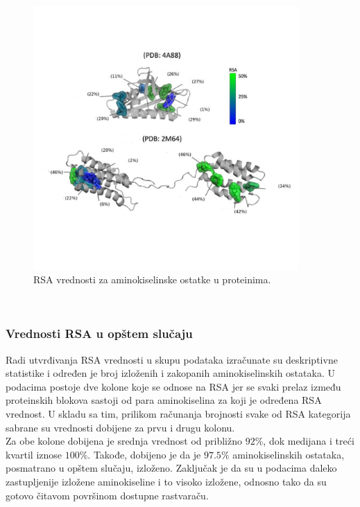 \documentclass[a4paper,12pt]{article}
\begin{document}
\begin{figure}[htbp]
    \centering
    \includegraphics[width=0.9\textwidth]{./images/rsa.png}
    \caption{RSA vrednosti za aminokiselinske ostatke u proteinima.}
    \label{Slika:rsa}
\end{figure}
\\
\subsubsection{Vrednosti RSA u opštem slučaju}
Radi utvrđivanja RSA vrednosti u skupu podataka izračunate su deskriptivne statistike i određen je broj izloženih i zakopanih aminokiselinskih ostataka. U podacima postoje dve kolone koje se odnose na RSA jer se svaki prelaz između proteinskih blokova sastoji od para aminokiselina za koji je određena RSA vrednost. U skladu sa tim, prilikom računanja brojnosti svake od RSA kategorija sabrane su vrednosti dobijene za prvu i drugu kolonu. \\
Za obe kolone dobijena je srednja vrednost od približno $92\%$, dok medijana i treći kvartil iznose $100\%$. Takođe, dobijeno je da je $97.5\%$ aminokiselinskih ostataka, posmatrano u opštem slučaju, izloženo. Zaključak je da su u podacima daleko zastupljenije izložene aminokiseline i to visoko izložene, odnosno tako da su gotovo čitavom površinom dostupne rastvaraču.
\end{document}
